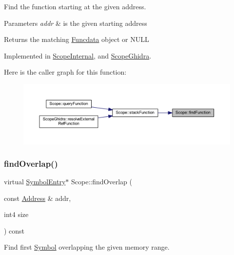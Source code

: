 Find the function starting at the given address. 


\begin{DoxyParams}{Parameters}
{\em addr} & is the given starting address \\
\hline
\end{DoxyParams}
\begin{DoxyReturn}{Returns}
the matching \mbox{\hyperlink{class_funcdata}{Funcdata}} object or N\+U\+LL 
\end{DoxyReturn}


Implemented in \mbox{\hyperlink{class_scope_internal_a03a52c629c51ad660eec8d10cf7f92aa}{Scope\+Internal}}, and \mbox{\hyperlink{class_scope_ghidra_a8bc17a80d5b2bd69f7900be5b55a382a}{Scope\+Ghidra}}.

Here is the caller graph for this function\+:
\nopagebreak
\begin{figure}[H]
\begin{center}
\leavevmode
\includegraphics[width=350pt]{class_scope_a2c621196f6fdb4b8ce4ee1f3dc953107_icgraph}
\end{center}
\end{figure}
\mbox{\label{class_scope_a3395b6194a59515caa1ede92fd6ac511}} 
\subsubsection{\texorpdfstring{findOverlap()}{findOverlap()}}
{\footnotesize\ttfamily virtual \mbox{\hyperlink{class_symbol_entry}{Symbol\+Entry}}$\ast$ Scope\+::find\+Overlap (\begin{DoxyParamCaption}\item[{const \mbox{\hyperlink{class_address}{Address}} \&}]{addr,  }\item[{int4}]{size }\end{DoxyParamCaption}) const\hspace{0.3cm}{\ttfamily [pure virtual]}}



Find first \mbox{\hyperlink{class_symbol}{Symbol}} overlapping the given memory range. 


